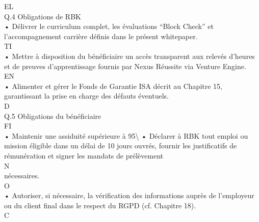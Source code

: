 \vspace{0.5em}
\vspace{0.5em}
\vspace{0.5em}
EL\\
Q.4 Obligations de RBK\\
• Délivrer le curriculum complet, les évaluations “Block Check” et l’accompagnement carrière définis dans le présent whitepaper.\\
\vspace{0.5em}
\vspace{0.5em}
\vspace{0.5em}
\vspace{0.5em}
TI\\
• Mettre à disposition du bénéficiaire un accès transparent aux relevés d’heures et de preuves d’apprentissage fournis par Nexus Réussite via Venture Engine.\\
\vspace{0.5em}
\vspace{0.5em}
\vspace{0.5em}
\vspace{0.5em}
EN\\
• Alimenter et gérer le Fonds de Garantie ISA décrit au Chapitre 15, garantissant la prise en charge des défauts éventuels.\\
\vspace{0.5em}
\vspace{0.5em}
\vspace{0.5em}
\vspace{0.5em}
D\\
Q.5 Obligations du bénéficiaire\\
\vspace{0.5em}
\vspace{0.5em}
FI\\
• Maintenir une assiduité supérieure à 95\textbackslash{}%
\vspace{0.5em}
• Déclarer à RBK tout emploi ou mission éligible dans un délai de 10 jours ouvrés, fournir les justificatifs de rémunération et signer les mandats de prélèvement\\
N\\
nécessaires.\\
O\\
• Autoriser, si nécessaire, la vérification des informations auprès de l’employeur ou du client final dans le respect du RGPD (cf. Chapitre 18).\\
C\\
